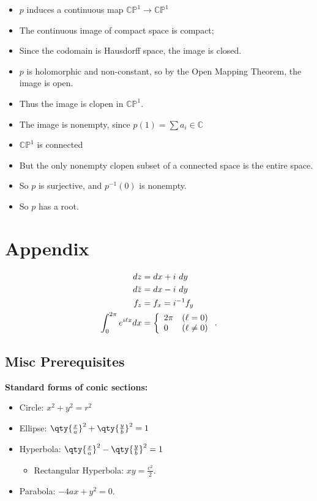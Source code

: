 \begin{itemize}
\tightlist
\item
  \(p\) induces a continuous map \({\mathbb{CP}}^1 \to {\mathbb{CP}}^1\)
\item
  The continuous image of compact space is compact;
\item
  Since the codomain is Hausdorff space, the image is closed.
\item
  \(p\) is holomorphic and non-constant, so by the Open Mapping Theorem,
  the image is open.
\item
  Thus the image is clopen in \({\mathbb{CP}}^1\).
\item
  The image is nonempty, since \(p(1) = \sum a_i \in {\mathbb{C}}\)
\item
  \({\mathbb{CP}}^1\) is connected
\item
  But the only nonempty clopen subset of a connected space is the entire
  space.
\item
  So \(p\) is surjective, and \(p^{-1}(0)\) is nonempty.
\item
  So \(p\) has a root.
\end{itemize}

\hypertarget{appendix}{%
\section{Appendix}\label{appendix}}

\begin{align*}
dz &= dx + i~dy \\
d\mkern 1.5mu\overline{\mkern-1.5muz\mkern-1.5mu}\mkern 1.5mu &= dx - i~dy \\
f_z &= f_x = i^{-1}f_y \\
\int_{0}^{2 \pi} e^{i \ell x} d x
&=\left\{\begin{array}{ll}{2 \pi} & {(\ell=0)} \\ {0} & {(\ell \neq 0)}\end{array}\right.
.\end{align*}

\hypertarget{misc-prerequisites}{%
\subsection{Misc Prerequisites}\label{misc-prerequisites}}

\textbf{Standard forms of conic sections:}

\begin{itemize}
\tightlist
\item
  Circle: \(x^2 + y^2 = r^2\)
\item
  Ellipse: \(\qty{\frac x a}^2 + \qty{\frac y b}^2 = 1\)
\item
  Hyperbola: \(\qty{\frac x a}^2 - \qty{\frac y b}^2 = 1\)

  \begin{itemize}
  \tightlist
  \item
    Rectangular Hyperbola: \(xy = \frac{c^2}{2}\).
  \end{itemize}
\item
  Parabola: \(-4ax + y^2 = 0\).
\end{itemize}

